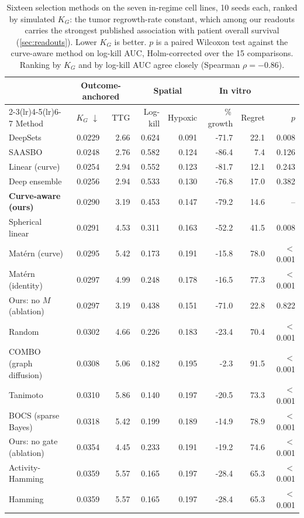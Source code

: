 \documentclass{article}
\begin{document}
\begin{table}[t]
\caption{Sixteen selection methods on the seven in-regime cell lines, 10
seeds each, ranked by simulated $K_G$: the tumor regrowth-rate
constant, which among our readouts carries the strongest published
association with patient overall survival (\cref{sec:readouts}). Lower $K_G$
is better. $p$ is a paired Wilcoxon test against the curve-aware method on
log-kill AUC, Holm-corrected over the 15 comparisons. Ranking by $K_G$ and by
log-kill AUC agree closely (Spearman $\rho = -0.86$).}
\label{tab:methods}
\vskip 0.1in
\centering
\small
\setlength{\tabcolsep}{5pt}
\begin{tabular}{lrrrrrrr}
\toprule
& \multicolumn{2}{c}{Outcome-anchored} & \multicolumn{2}{c}{Spatial} & \multicolumn{2}{c}{In vitro} & \\
\cmidrule(lr){2-3}\cmidrule(lr){4-5}\cmidrule(lr){6-7}
Method & $K_G$ $\downarrow$ & TTG & Log-kill & Hypoxic & \%\,growth & Regret & $p$ \\
\midrule
DeepSets & 0.0229 & 2.66 & 0.624 & 0.091 & -71.7 & 22.1 & 0.008 \\
SAASBO & 0.0248 & 2.76 & 0.582 & 0.124 & -86.4 & 7.4 & 0.126 \\
Linear (curve) & 0.0254 & 2.94 & 0.552 & 0.123 & -81.7 & 12.1 & 0.243 \\
Deep ensemble & 0.0256 & 2.94 & 0.533 & 0.130 & -76.8 & 17.0 & 0.382 \\
\textbf{Curve-aware (ours)} & 0.0290 & 3.19 & 0.453 & 0.147 & -79.2 & 14.6 & -- \\
Spherical linear & 0.0291 & 4.53 & 0.311 & 0.163 & -52.2 & 41.5 & 0.008 \\
Mat\'ern (curve) & 0.0295 & 5.42 & 0.173 & 0.191 & -15.8 & 78.0 & $<$0.001 \\
Mat\'ern (identity) & 0.0297 & 4.99 & 0.248 & 0.178 & -16.5 & 77.3 & $<$0.001 \\
Ours: no $M$ (ablation) & 0.0297 & 3.19 & 0.438 & 0.151 & -71.0 & 22.8 & 0.822 \\
Random & 0.0302 & 4.66 & 0.226 & 0.183 & -23.4 & 70.4 & $<$0.001 \\
COMBO (graph diffusion) & 0.0308 & 5.06 & 0.182 & 0.195 & -2.3 & 91.5 & $<$0.001 \\
Tanimoto & 0.0310 & 5.86 & 0.140 & 0.197 & -20.5 & 73.3 & $<$0.001 \\
BOCS (sparse Bayes) & 0.0318 & 5.42 & 0.199 & 0.189 & -14.9 & 78.9 & $<$0.001 \\
Ours: no gate (ablation) & 0.0354 & 4.45 & 0.233 & 0.191 & -19.2 & 74.6 & $<$0.001 \\
Activity-Hamming & 0.0359 & 5.57 & 0.165 & 0.197 & -28.4 & 65.3 & $<$0.001 \\
Hamming & 0.0359 & 5.57 & 0.165 & 0.197 & -28.4 & 65.3 & $<$0.001 \\
\bottomrule
\end{tabular}
\vskip -0.1in
\end{table}
\end{document}
